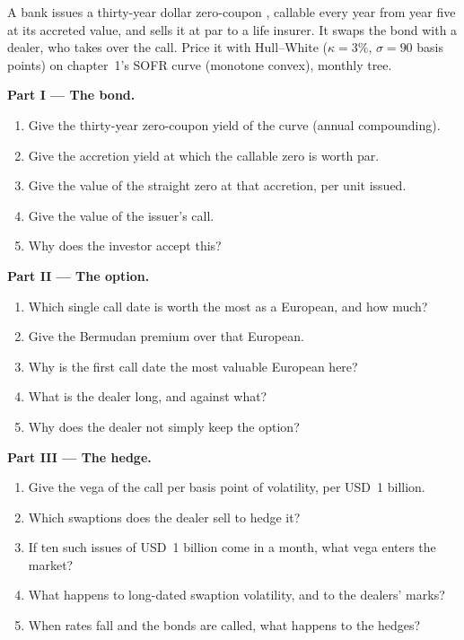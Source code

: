 \begin{problem}\label{pb:rc:bermudans-and-callables:1}
A bank issues a thirty-year dollar zero-coupon , callable every year from
year five at its accreted value, and sells it at par to a life insurer. It swaps the
bond with a dealer, who takes over the call. Price it with Hull--White ($\kappa=3\%$,
$\sigma=90$ basis points) on chapter~1's SOFR curve (monotone convex), monthly tree.

\medskip\noindent\textbf{Part I --- The bond.}
\begin{enumerate}
\item Give the thirty-year zero-coupon yield of the curve (annual compounding).
\item Give the accretion yield at which the callable zero is worth par.
\item Give the value of the straight zero at that accretion, per unit issued.
\item Give the value of the issuer's call.
\item Why does the investor accept this?
\end{enumerate}

\medskip\noindent\textbf{Part II --- The option.}
\begin{enumerate}[resume]
\item Which single call date is worth the most as a European, and how much?
\item Give the Bermudan premium over that European.
\item Why is the first call date the most valuable European here?
\item What is the dealer long, and against what?
\item Why does the dealer not simply keep the option?
\end{enumerate}

\medskip\noindent\textbf{Part III --- The hedge.}
\begin{enumerate}[resume]
\item Give the vega of the call per basis point of volatility, per USD~1 billion.
\item Which swaptions does the dealer sell to hedge it?
\item If ten such issues of USD~1 billion come in a month, what vega enters the market?
\item What happens to long-dated swaption volatility, and to the dealers' marks?
\item When rates fall and the bonds are called, what happens to the hedges?
\end{enumerate}


\end{problem}
